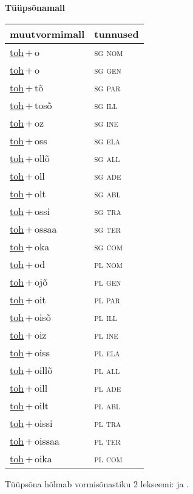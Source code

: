 
\vspace{1.8em}
\begin{minipage}{\textwidth}
\textbf{Tüüpsõnamall \,}\\

\begin{sideways}
\begin{tabular}{l l}
muutvormimall & tunnused \\
\hline
\underline{toh}\,+\,o & \textsc{ sg nom } \\
\underline{toh}\,+\,o & \textsc{ sg gen } \\
\underline{toh}\,+\,tõ & \textsc{ sg par } \\
\underline{toh}\,+\,tosõ & \textsc{ sg ill } \\
\underline{toh}\,+\,oz & \textsc{ sg ine } \\
\underline{toh}\,+\,oss & \textsc{ sg ela } \\
\underline{toh}\,+\,ollõ & \textsc{ sg all } \\
\underline{toh}\,+\,oll & \textsc{ sg ade } \\
\underline{toh}\,+\,olt & \textsc{ sg abl } \\
\underline{toh}\,+\,ossi & \textsc{ sg tra } \\
\underline{toh}\,+\,ossaa & \textsc{ sg ter } \\
\underline{toh}\,+\,oka & \textsc{ sg com } \\
\underline{toh}\,+\,od & \textsc{ pl nom } \\
\underline{toh}\,+\,ojõ & \textsc{ pl gen } \\
\underline{toh}\,+\,oit & \textsc{ pl par } \\
\underline{toh}\,+\,oisõ & \textsc{ pl ill } \\
\underline{toh}\,+\,oiz & \textsc{ pl ine } \\
\underline{toh}\,+\,oiss & \textsc{ pl ela } \\
\underline{toh}\,+\,oillõ & \textsc{ pl all } \\
\underline{toh}\,+\,oill & \textsc{ pl ade } \\
\underline{toh}\,+\,oilt & \textsc{ pl abl } \\
\underline{toh}\,+\,oissi & \textsc{ pl tra } \\
\underline{toh}\,+\,oissaa & \textsc{ pl ter } \\
\underline{toh}\,+\,oika & \textsc{ pl com } \\
\end{tabular}
\end{sideways}
\label{tab:tüüpsõnamall-toho}

\end{minipage}

 
\vspace{1em}
\noindent Tüüpsõna hõlmab vormisõnastiku 2 lekseemi:  ja .
